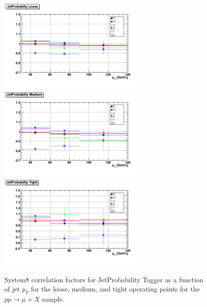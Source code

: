\begin{figure}[htbp]
  \begin{center}
    \includegraphics[width=75mm]{Figures/JPL_correlations_ppmux.png}
    \includegraphics[width=75mm]{Figures/JPM_correlations_ppmux.png}
    \includegraphics[width=75mm]{Figures/JPT_correlations_ppmux.png}
  \end{center}
  \caption{System8 correlation factors for JetProbability Tagger as a function
of jet $p_T $ for the loose, medium, and tight operating points for the
$pp\rightarrow \mu +X$ sample.}
  \label{fig:correlation_TP}
\end{figure}


